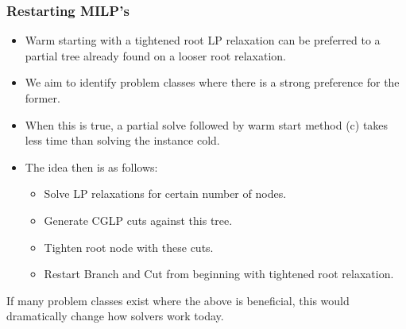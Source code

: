 \documentclass{beamer}
\begin{document}
	\begin{frame}[t]
		\frametitle{Restarting MILP's}
		\small
		\vspace{0cm}
		\begin{itemize}
			\item Warm starting with a tightened root LP relaxation can be preferred to a partial tree already found on a looser root relaxation.
			\item We aim to identify problem classes where there is a strong preference for the former.
			\item When this is true, a partial solve followed by warm start method (c) takes less time than solving the instance cold.
			\item The idea then is as follows:
			\begin{itemize}
				\item Solve LP relaxations for certain number of nodes.
				\item Generate CGLP cuts against this tree.
				\item Tighten root node with these cuts.
				\item Restart Branch and Cut from beginning with tightened root relaxation.
			\end{itemize}
		\end{itemize}
		\vspace{0cm}
		\begin{block}{}
			If many problem classes exist where the above is beneficial, this would dramatically change how solvers work today.
		\end{block}
		\normalsize
	\end{frame}
	
\end{document}
